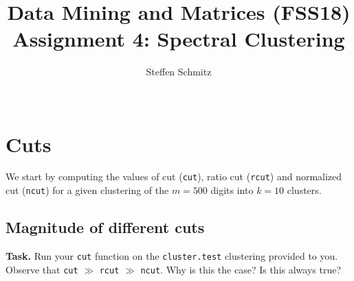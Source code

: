 \documentclass{support/acm_proc_article-sp}
\begin{document}
    \title{Data Mining and Matrices (FSS18) \\ Assignment 4: Spectral Clustering}

    \author{
    \alignauthor
    Steffen Schmitz\\
    \\
    }

    \maketitle


    \section{Cuts}

    We start by computing the values of cut (\lstinline{cut}), ratio cut (\lstinline{rcut}) and normalized cut
    (\lstinline{ncut}) for a given clustering of the $m = 500$ digits into $k = 10$ clusters.



    \subsection{Magnitude of different cuts}

    \textbf{Task.} Run your \lstinline{cut} function on the \lstinline{cluster.test} clustering provided to you.
    Observe that \lstinline{cut} $\gg$ \lstinline{rcut} $\gg$ \lstinline{ncut}.
    Why is this the case?
    Is this always true?
\end{document}
